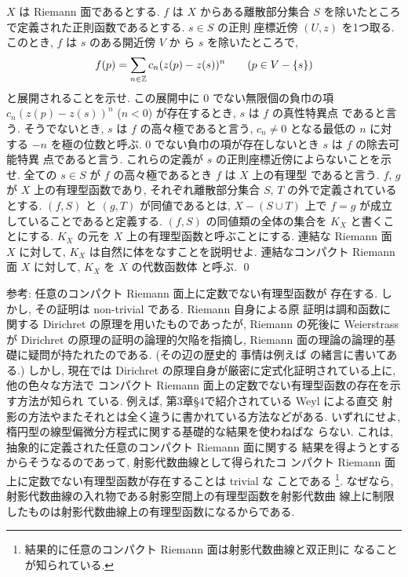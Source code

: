 \documentclass[12pt,twoside]{jarticle}
\def\setminus{-}
\def\Z{{\Bbb Z}} %
\begin{document}
\begin{question}
  $X$ は Riemann 面であるとする. $f$ は $X$ からある離散部分集合 $S$ 
  を除いたところで定義された正則函数であるとする. $s\in S$ の正則
  座標近傍 $(U,z)$ を1つ取る. このとき, $f$ は $s$ のある開近傍 $V$ か
  ら $s$ を除いたところで, 
  \[
    f(p) = \sum_{n\in\Z} c_n (z(p) - z(s))^n
    \qquad
    (p\in V \setminus \{s\})
  \]
  と展開されることを示せ. この展開中に $0$ でない無限個の負巾の項 %
  $c_n (z(p)-z(s))^n$ ($n<0$) が存在するとき, $s$ は $f$ の真性特異点
  であると言う. そうでないとき, $s$ は $f$ の高々極であると言う, 
  $c_n\ne0$ となる最低の $n$ に対する $-n$ を極の位数と呼ぶ.
  $0$ でない負巾の項が存在しないとき $s$ は $f$ の除去可能特異
  点であると言う. これらの定義が $s$ の正則座標近傍によらないことを示
  せ. 全ての $s\in S$ が $f$ の高々極であるとき $f$ は $X$ 上の有理型
  であると言う. %
  $f$, $g$ が $X$ 上の有理型函数であり, それぞれ離散部分集合 $S$, $T$ 
  の外で定義されているとする. $(f,S)$ と $(g,T)$ が同値であるとは,
  $X\setminus (S\cup T)$ 上で $f=g$ が成立していることであると定義する.
  $(f,S)$ の同値類の全体の集合を $K_X$ と書くことにする.
  $K_X$ の元を $X$ 上の有理型函数と呼ぶことにする. %
  連結な Riemann 面 $X$ に対して, $K_X$ は自然に体をなすことを説明せよ.
  連結なコンパクト Riemann 面 $X$ に対して, $K_X$ を $X$ の代数函数体
  と呼ぶ.  \qed
\end{question}

\noindent 参考: 任意のコンパクト Riemann 面上に定数でない有理型函数が
存在する. しかし, その証明は non-trivial である. Riemann 自身による原
証明は調和函数に関する Dirichret の原理を用いたものであったが, Riemann 
の死後に Weierstrass が Dirichret の原理の証明の論理的欠陥を指摘し,
Riemann 面の理論の論理的基礎に疑問が持たれたのである. (その辺の歴史的
事情は例えば \cite{Iwasawa} の緒言に書いてある.) しかし, 現在では 
Dirichret の原理自身が厳密に定式化証明されている上に, 他の色々な方法で
コンパクト Riemann 面上の定数でない有理型函数の存在を示す方法が知られ
ている. 例えば, \cite{Iwasawa}第3章\S4で紹介されている Weyl による直交
射影の方法やまたそれとは全く違う\cite{Gun}に書かれている方法などがある.
いずれにせよ, 楕円型の線型偏微分方程式に関する基礎的な結果を使わねばな
らない. これは, 抽象的に定義された任意のコンパクト Riemann 面に関する
結果を得ようとするからそうなるのであって, 射影代数曲線として得られたコ
ンパクト Riemann 面上に定数でない有理型函数が存在することは trivial な
ことである%
\footnote{結果的に任意のコンパクト Riemann 面は射影代数曲線と双正則に
  なることが知られている.}. %
なぜなら, 射影代数曲線の入れ物である射影空間上の有理型函数を射影代数曲
線上に制限したものは射影代数曲線上の有理型函数になるからである.
\end{document}
